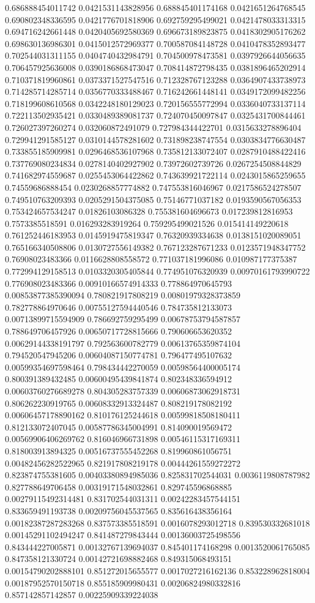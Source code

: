 \begin{table}
\begin{tabu}
\begin{sparkline}{10}
0.686888454011742 0.0421531143828956 0.688845401174168 0.0421651264768545 0.690802348336595 0.0421776701818906 0.692759295499021 0.0421478033313315 0.694716242661448 0.0420405692580369 0.696673189823875 0.0418302905176262 0.698630136986301 0.0415012572969377 0.700587084148728 0.0410478352893477 0.702544031311155 0.0404740432984791 0.704500978473581 0.0397926644056635 0.706457925636008 0.0390186868473047 0.708414872798435 0.0381896465202914 0.710371819960861 0.0373371527547516 0.712328767123288 0.0364907433738973 0.714285714285714 0.0356770333488467 0.716242661448141 0.0349172099482256 0.718199608610568 0.0342248180129023 0.720156555772994 0.0336040733137114 0.722113502935421 0.0330489389081737 0.724070450097847 0.0325431700844461 0.726027397260274 0.032060872491079 0.727984344422701 0.0315633278896404 0.729941291585127 0.0310144578281602 0.731898238747554 0.0303834776630487 0.733855185909981 0.0296468536107968 0.735812133072407 0.0287910488422416 0.737769080234834 0.0278140402927902 0.73972602739726 0.0267254508844829 0.741682974559687 0.0255453064422862 0.743639921722114 0.0243015865259655 0.74559686888454 0.0230268857774882 0.747553816046967 0.0217586524278507 0.749510763209393 0.0205291504375085 0.75146771037182 0.0193590567056353 0.753424657534247 0.01826103086328 0.755381604696673 0.017239812816953 0.7573385518591 0.016293283919264 0.759295499021526 0.015414149220618 0.761252446183953 0.0145919475819347 0.76320939334638 0.0138151020089051 0.765166340508806 0.0130727556149382 0.767123287671233 0.0123571948347752 0.76908023483366 0.0116628808558572 0.771037181996086 0.010987177375387 0.772994129158513 0.0103320305405844 0.774951076320939 0.00970161793990722 0.776908023483366 0.00910166574914333 0.778864970645793 0.00853877385390094 0.780821917808219 0.00801979328373859 0.782778864970646 0.00755127594440546 0.784735812133073 0.00713899715594909 0.786692759295499 0.00678753794587857 0.788649706457926 0.00650717728815666 0.790606653620352 0.00629144338191797 0.792563600782779 0.00613765359874104 0.794520547945206 0.00604087150774781 0.796477495107632 0.00599354697598464 0.798434442270059 0.00598564400005174 0.800391389432485 0.00600495439841874 0.802348336594912 0.00603760276689278 0.804305283757339 0.00606873062918731 0.806262230919765 0.00608332913324487 0.808219178082192 0.00606457178890162 0.810176125244618 0.00599818508180411 0.812133072407045 0.00587786345004991 0.814090019569472 0.00569906406269762 0.816046966731898 0.00546115317169311 0.818003913894325 0.00516737555452268 0.819960861056751 0.00482456282522965 0.821917808219178 0.00444261559272272 0.823874755381605 0.00403380894985036 0.825831702544031 0.0036119808787982 0.827788649706458 0.00319171548032861 0.829745596868885 0.00279115492314481 0.831702544031311 0.00242283457544151 0.833659491193738 0.00209756045537565 0.835616438356164 0.00182387287283268 0.837573385518591 0.0016078293012718 0.839530332681018 0.00145291102494247 0.841487279843444 0.00136003725498556 0.843444227005871 0.00132767139694037 0.845401174168298 0.0013520061765085 0.847358121330724 0.00142721698882468 0.849315068493151 0.00154790202888101 0.851272015655577 0.0017027216162136 0.853228962818004 0.00187952570150718 0.855185909980431 0.00206824980332816 0.857142857142857 0.00225909339224038 
\end{sparkline}
\end{tabu}
\end{table}
